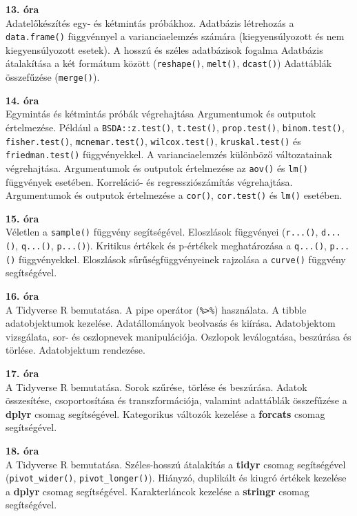 \documentclass[
]{book}
\begin{document}
\textbf{13. óra}\\
Adatelőkészítés egy- és kétmintás próbákhoz. Adatbázis létrehozás a \texttt{data.frame()} függvénnyel a varianciaelemzés számára (kiegyensúlyozott és nem kiegyensúlyozott esetek). A hosszú és széles adatbázisok fogalma Adatbázis átalakítása a két formátum között (\texttt{reshape()}, \texttt{melt()}, \texttt{dcast()}) Adattáblák összefűzése (\texttt{merge()}).

\textbf{14. óra}\\
Egymintás és kétmintás próbák végrehajtása Argumentumok és outputok értelmezése. Például a \texttt{BSDA::z.test()}, \texttt{t.test()}, \texttt{prop.test()}, \texttt{binom.test()}, \texttt{fisher.test()}, \texttt{mcnemar.test()}, \texttt{wilcox.test()}, \texttt{kruskal.test()} és \texttt{friedman.test()} függvényekkel. A varianciaelemzés különböző változatainak végrehajtása. Argumentumok és outputok értelmezése az \texttt{aov()} és \texttt{lm()} függvények esetében. Korreláció- és regressziószámítás végrehajtása. Argumentumok és outputok értelmezése a \texttt{cor()}, \texttt{cor.test()} és \texttt{lm()} esetében.

\textbf{15. óra}\\
Véletlen a \texttt{sample()} függvény segítségével. Eloszlások függvényei (\texttt{r...()}, \texttt{d...()}, \texttt{q...()}, \texttt{p...()}). Kritikus értékek és p-értékek meghatározása a \texttt{q...()}, \texttt{p...()} függvényekkel. Eloszlások sűrűségfüggvényeinek rajzolása a \texttt{curve()} függvény segítségével.

\textbf{16. óra}\\
A Tidyverse R bemutatása. A pipe operátor (\texttt{\%\textgreater{}\%}) használata. A tibble adatobjektumok kezelése. Adatállományok beolvasás és kiírása. Adatobjektom vizsgálata, sor- és oszlopnevek manipulációja. Oszlopok leválogatása, beszúrása és törlése. Adatobjektum rendezése.

\textbf{17. óra}\\
A Tidyverse R bemutatása. Sorok szűrése, törlése és beszúrása. Adatok összesítése, csoportosítása és transzformációja, valamint adattáblák összefűzése a \textbf{dplyr} csomag segítségével. Kategorikus változók kezelése a \textbf{forcats} csomag segítségével.

\textbf{18. óra}\\
A Tidyverse R bemutatása. Széles-hosszú átalakítás a \textbf{tidyr} csomag segítségével (\texttt{pivot\_wider()}, \texttt{pivot\_longer()}). Hiányzó, duplikált és kiugró értékek kezelése a \textbf{dplyr} csomag segítségével. Karakterláncok kezelése a \textbf{stringr} csomag segítségével.
\end{document}
